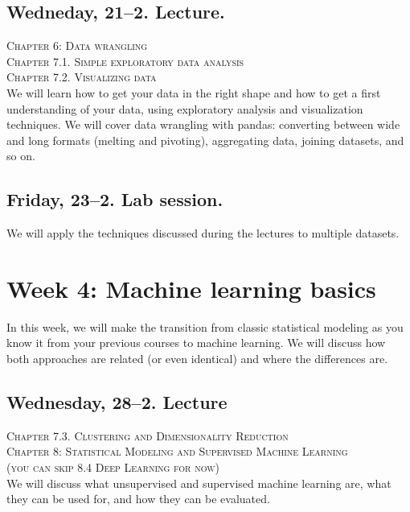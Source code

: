 \subsection*{Wedneday, 21--2. Lecture.}
\textsc{ Chapter 6: Data wrangling}\\
\textsc{ Chapter 7.1. Simple exploratory data analysis}\\
\textsc{ Chapter 7.2. Visualizing data}\\

We will learn how to get your data in the right shape and how to get a first understanding of your data, using exploratory analysis and visualization techniques. We will cover data wrangling with pandas: converting between wide and long formats (melting and pivoting), aggregating data, joining datasets, and so on.


\subsection*{Friday, 23--2. Lab session.}
We will apply the techniques discussed during the lectures to multiple datasets.







\section*{Week 4: Machine learning basics}
In this week, we will make the transition from classic statistical modeling as you know it from your previous courses to machine learning. We will discuss how both approaches are related  (or even identical) and where the differences are.


\subsection*{Wednesday, 28--2. Lecture}
\textsc{ Chapter 7.3. Clustering and Dimensionality Reduction}\\
\textsc{ Chapter 8: Statistical Modeling and Supervised Machine Learning}\\
\textsc{ (you can skip 8.4 Deep Learning for now)}\\

We will discuss what unsupervised and supervised machine learning are, what they can be used for, and how they can be evaluated.

